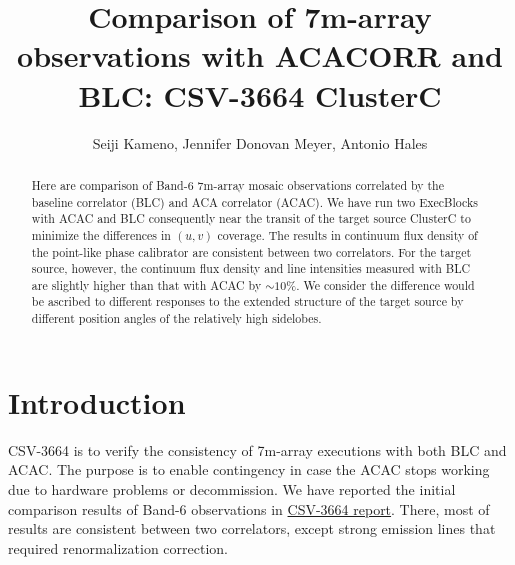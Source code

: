 \documentclass[a4paper, 10pt]{scrartcl}
\begin{document}
\title{Comparison of 7m-array observations with ACACORR and BLC: CSV-3664 ClusterC}
\author{Seiji Kameno, Jennifer Donovan Meyer, Antonio Hales}
\maketitle
\begin{abstract}
Here are comparison of Band-6 7m-array mosaic observations correlated by the baseline correlator (BLC) and ACA correlator (ACAC).
We have run two ExecBlocks with ACAC and BLC consequently near the transit of the target source ClusterC to minimize the differences in $(u, v)$ coverage.
The results in continuum flux density of the point-like phase calibrator are consistent between two correlators.
For the target source, however, the continuum flux density and line intensities measured with BLC are slightly higher than that with ACAC by $\sim 10$\%.
We consider the difference would be ascribed to different responses to the extended structure of the target source by different position angles of the relatively high sidelobes.
\end{abstract}

\section{Introduction}
CSV-3664 is to verify the consistency of 7m-array executions with both BLC and ACAC. The purpose is to enable contingency in case the ACAC stops working due to hardware problems or decommission.
We have reported the initial comparison results of Band-6 observations in \href{http://www.alma.cl/~skameno/Documents/CSV-3664/}{CSV-3664 report}. There, most of results are consistent between two correlators, except strong emission lines that required renormalization correction.
\end{document}
